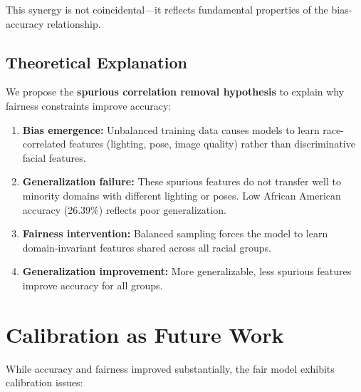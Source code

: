 \documentclass[11pt,a4paper,oneside]{report}
\begin{document}
This synergy is not coincidental---it reflects fundamental properties of the bias-accuracy relationship.

\subsection{Theoretical Explanation}

We propose the \textbf{spurious correlation removal hypothesis} to explain why fairness constraints improve accuracy:

\begin{enumerate}

\item \textbf{Bias emergence:} Unbalanced training data causes models to learn race-correlated features (lighting, pose, image quality) rather than discriminative facial features.

\item \textbf{Generalization failure:} These spurious features do not transfer well to minority domains with different lighting or poses. Low African American accuracy (26.39\%) reflects poor generalization.

\item \textbf{Fairness intervention:} Balanced sampling forces the model to learn domain-invariant features shared across all racial groups.

\item \textbf{Generalization improvement:} More generalizable, less spurious features improve accuracy for all groups.

\end{enumerate}

\section{Calibration as Future Work}

While accuracy and fairness improved substantially, the fair model exhibits calibration issues:
\end{document}
